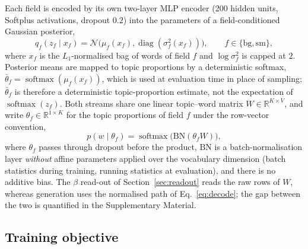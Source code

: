 \documentclass[11pt]{article}
\begin{document}
Each field is encoded by its own two-layer MLP encoder (200 hidden units, Softplus activations,
dropout $0.2$) into the parameters of a field-conditioned Gaussian posterior,
\begin{equation}
q_f(z_f\mid x_f)=\mathcal N\big(\mu_f(x_f),\operatorname{diag}(\sigma_f^2(x_f))\big),
\qquad f\in\{\mathrm{bg},\mathrm{sm}\},
\end{equation}
where $x_f$ is the $L_1$-normalised bag of words of field $f$ and $\log\sigma_f^2$ is capped at
$2$. Posterior means are mapped to topic proportions by a deterministic softmax,
$\bar\theta_f=\operatorname{softmax}(\mu_f(x_f))$, which is used at evaluation time in place of
sampling; $\bar\theta_f$ is therefore a deterministic topic-proportion estimate, not the
expectation of $\operatorname{softmax}(z_f)$. Both streams share one linear topic--word matrix
$W\in\mathbb{R}^{K\times V}$, and write $\theta_f\in\mathbb{R}^{1\times K}$ for the topic
proportions of field $f$ under the row-vector convention,
\begin{equation}
p(w\mid\theta_f)=\operatorname{softmax}\!\big(\mathrm{BN}(\theta_f W)\big),
\label{eq:decode}
\end{equation}
where $\theta_f$ passes through dropout before the product, $\mathrm{BN}$ is a batch-normalisation
layer \emph{without} affine parameters applied over the vocabulary dimension (batch statistics
during training, running statistics at evaluation), and there is no additive bias. The $\beta$
read-out of Section~\ref{sec:readout} reads the raw rows of $W$, whereas generation uses the
normalised path of Eq.~\eqref{eq:decode}; the gap between the two is quantified in the
Supplementary Material.

\subsection{Training objective}
\end{document}
